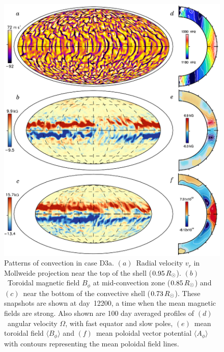 \begin{figure}
  \begin{center}
    \includegraphics{figs/chapter_8/mmc_vturf_3_SC_patterns.eps}
  \end{center}
  \caption[Patterns of convection in case D3a]{Patterns of convection
  in case D3a.  $(a)$~Radial velocity $v_r$ in Mollweide projection
  near the top of the shell ($0.95\thinspace R_\odot$).  
  $(b)$~Toroidal magnetic field $B_\phi$ at mid-convection zone
  ($0.85\thinspace R_\odot$) and
  $(c)$~near the bottom of the
  convective shell ($0.73\thinspace R_\odot$).
  These snapshots are shown at day~12200, a time when the mean
  magnetic fields are strong.
  Also shown are 100 day averaged profiles of $(d)$~angular velocity $\Omega$, with fast equator and
  slow poles, $(e)$~mean toroidal field $\langle B_\phi \rangle$ and
  $(f)$~mean poloidal vector potential $\langle A_\phi \rangle$ with
  contours representing the mean poloidal field lines.
  \label{fig:D3a convection}} 
\end{figure}

